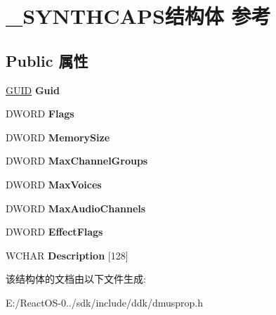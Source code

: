 \hypertarget{struct___s_y_n_t_h_c_a_p_s}{}\section{\+\_\+\+S\+Y\+N\+T\+H\+C\+A\+P\+S结构体 参考}
\label{struct___s_y_n_t_h_c_a_p_s}
\subsection*{Public 属性}
\begin{DoxyCompactItemize}
\item 
\mbox{\label{struct___s_y_n_t_h_c_a_p_s_abf31cc627442ab65a4906f225afc5b77}} 
\hyperlink{interface_g_u_i_d}{G\+U\+ID} {\bfseries Guid}
\item 
\mbox{\label{struct___s_y_n_t_h_c_a_p_s_a5eadfca726294fa0d49d5fce5f6c9d6f}} 
D\+W\+O\+RD {\bfseries Flags}
\item 
\mbox{\label{struct___s_y_n_t_h_c_a_p_s_a965e9035fdfca58864333a69ec504c0f}} 
D\+W\+O\+RD {\bfseries Memory\+Size}
\item 
\mbox{\label{struct___s_y_n_t_h_c_a_p_s_a9eba6b3fff87571726b68cb4e620c83c}} 
D\+W\+O\+RD {\bfseries Max\+Channel\+Groups}
\item 
\mbox{\label{struct___s_y_n_t_h_c_a_p_s_af772b9ffeafee9b6d878af1731fe1d60}} 
D\+W\+O\+RD {\bfseries Max\+Voices}
\item 
\mbox{\label{struct___s_y_n_t_h_c_a_p_s_ab75fd3f36d69ed3e3b2fe0c406f60cb6}} 
D\+W\+O\+RD {\bfseries Max\+Audio\+Channels}
\item 
\mbox{\label{struct___s_y_n_t_h_c_a_p_s_aef6858e01590069f9b84a54577567edb}} 
D\+W\+O\+RD {\bfseries Effect\+Flags}
\item 
\mbox{\label{struct___s_y_n_t_h_c_a_p_s_a2f28eaed2290cf1b0c649b2c07e561c8}} 
W\+C\+H\+AR {\bfseries Description} \mbox{[}128\mbox{]}
\end{DoxyCompactItemize}


该结构体的文档由以下文件生成\+:\begin{DoxyCompactItemize}
\item 
E\+:/\+React\+O\+S-\/0../sdk/include/ddk/dmusprop.\+h\end{DoxyCompactItemize}
